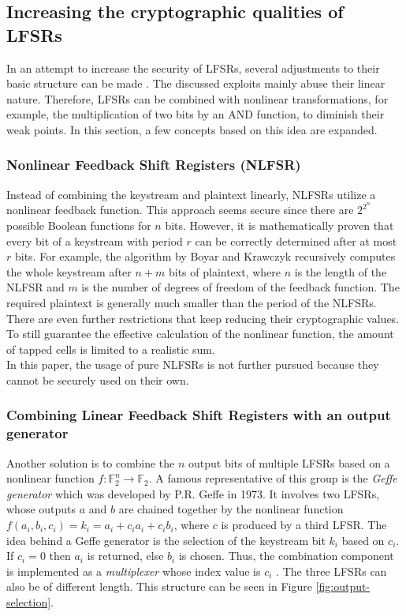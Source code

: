 
\subsection{Increasing the cryptographic qualities of LFSRs}

In an attempt to increase the security of LFSRs, several adjustments to their basic structure can be made \cite[p. 97]{Pommerening.2000}. The discussed exploits mainly abuse their linear nature. Therefore, LFSRs can be combined with nonlinear transformations, for example, the multiplication of two bits by an AND function, to diminish their weak points. In this section, a few concepts based on this idea are expanded.

\subsubsection{Nonlinear Feedback Shift Registers (NLFSR)}

Instead of combining the keystream and plaintext linearly, NLFSRs utilize a nonlinear feedback function. This approach seems secure since there are $2^{2^n}$ possible Boolean functions for $n$ bits. However, it is mathematically proven that every bit of a keystream with period $r$ can be correctly determined after at most $r$ bits. For example, the algorithm by Boyar and Krawczyk recursively computes the whole keystream after $n+m$ bits of plaintext, where $n$ is the length of the NLFSR and $m$ is the number of degrees of freedom of the feedback function. The required plaintext is generally much smaller than the period of the NLFSRs. There are even further restrictions that keep reducing their cryptographic values. To still guarantee the effective calculation of the nonlinear function, the amount of tapped cells is limited to a realistic sum. \cite{Pommerening.2015}   \\

In this paper, the usage of pure NLFSRs is not further pursued because they cannot be securely used on their own. \cite[p. 97]{Pommerening.2000}


\subsubsection{Combining Linear Feedback Shift Registers with an output generator}

Another solution is to combine the $n$ output bits of multiple LFSRs based on a nonlinear function $f: \mathbb{F}^n_2 \rightarrow \mathbb{F}_2$. A famous representative of this group is the \emph{Geffe generator} which was developed by P.R. Geffe in 1973. It involves two LFSRs, whose outputs $a$ and $b$ are chained together by the nonlinear function $f(a_i,b_i,c_i) = k_i = a_i+c_ia_i+c_ib_i $, where $c$ is produced by a third LFSR. The idea behind a Geffe generator is the selection of the keystream bit $k_i$ based on $c_i$. If $c_i=0$ then $a_i$ is returned, else $b_i$ is chosen. \cite{Handayani.2019} Thus, the combination component is implemented as a \emph{multiplexer} whose index value is $c_i$ \cite[p. 19]{Robshaw.1995}. The three LFSRs can also be of different length. This structure can be seen in Figure \ref{fig:output-selection}. 

